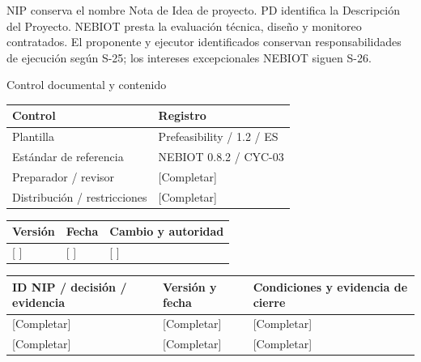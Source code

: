 \vspace{2mm}
NIP conserva el nombre Nota de Idea de proyecto. PD identifica la Descripción del Proyecto.
\vspace{2mm}
NEBIOT presta la evaluación técnica, diseño y monitoreo contratados. El proponente y ejecutor identificados conservan responsabilidades de ejecución según S-25; los intereses excepcionales NEBIOT siguen S-26.
\clearpage
{\fontsize{23}{27}\selectfont\color{NEBGreen}Control documental y contenido\par}
\vspace{3mm}
{\sffamily\fontsize{8.3}{10.3}\selectfont\begin{longtable}{@{}P{50.55mm} P{117.94mm}@{}}
\toprule
\textbf{Control} & \textbf{Registro}\\\midrule\endhead
\rule{0pt}{7.7mm}Plantilla & Prefeasibility / 1.2 / ES\\\hline
\rule{0pt}{7.7mm}Estándar de referencia & NEBIOT 0.8.2 / CYC-03\\\hline
\rule{0pt}{7.7mm}Preparador / revisor & [Completar]\\\hline
\rule{0pt}{7.7mm}Distribución / restricciones & [Completar]\\\hline
\end{longtable}}
{\sffamily\fontsize{8.3}{10.3}\selectfont\begin{longtable}{@{}P{31.34mm} P{37.94mm} P{95.68mm}@{}}
\toprule
\textbf{Versión} & \textbf{Fecha} & \textbf{Cambio y autoridad}\\\midrule\endhead
\rule{0pt}{7.7mm}[ ] & [ ] & [ ]\\\hline
\end{longtable}}
{\sffamily\fontsize{9.5}{11.4}\selectfont\tableofcontents}
{\sffamily\fontsize{8.3}{10.3}\selectfont\begin{longtable}{@{}P{57.74mm} P{36.29mm} P{70.94mm}@{}}
\toprule
\textbf{ID NIP / decisión / evidencia} & \textbf{Versión y fecha} & \textbf{Condiciones y evidencia de cierre}\\\midrule\endhead
\rule{0pt}{7.7mm}[Completar] & [Completar] & [Completar]\\\hline
\rule{0pt}{7.7mm}[Completar] & [Completar] & [Completar]\\\hline
\end{longtable}}
